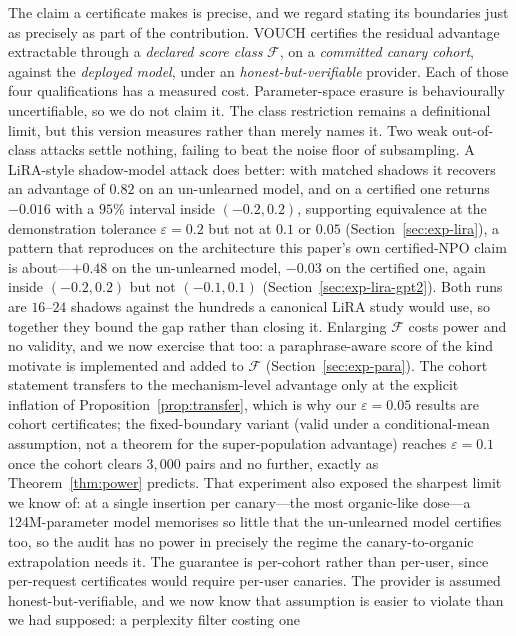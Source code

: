 \documentclass[pdflatex,sn-mathphys-num]{sn-jnl}
\theoremstyle{thmstyleone}
\theoremstyle{thmstyletwo}
\theoremstyle{thmstylethree}
\newcommand{\F}{\mathcal{F}}
\newcommand{\eps}{\varepsilon}
\begin{document}
The claim a certificate makes is precise, and we regard stating its boundaries just as
precisely as part of the contribution. VOUCH certifies the residual advantage
extractable through a \emph{declared score class} $\F$, on a \emph{committed canary
cohort}, against the \emph{deployed model}, under an \emph{honest-but-verifiable}
provider. Each of those four qualifications has a measured cost. Parameter-space
erasure is behaviourally uncertifiable, so we do not claim it. The class restriction
remains a definitional limit, but this version measures rather than merely names it.
Two weak out-of-class attacks settle nothing, failing to beat the noise floor of
subsampling. A LiRA-style shadow-model attack does better: with matched shadows it
recovers an advantage of $0.82$ on an un-unlearned model, and on a certified one
returns $-0.016$ with a $95\%$ interval inside $(-0.2, 0.2)$, supporting equivalence at
the demonstration tolerance $\eps=0.2$ but not at $0.1$ or $0.05$
(Section~\ref{sec:exp-lira}), a pattern that reproduces on the architecture this
paper's own certified-NPO claim is about---$+0.48$ on the un-unlearned model,
$-0.03$ on the certified one, again inside $(-0.2, 0.2)$ but not $(-0.1, 0.1)$
(Section~\ref{sec:exp-lira-gpt2}). Both runs are $16$--$24$ shadows against the
hundreds a canonical LiRA study would use, so together they bound the gap rather than
closing it. Enlarging $\F$ costs power and no validity, and
we now exercise that too: a paraphrase-aware score of the kind
\citet{li2026beliefs} motivate is implemented and added to $\F$
(Section~\ref{sec:exp-para}). The cohort statement transfers to
the mechanism-level advantage only at the explicit inflation of
Proposition~\ref{prop:transfer}, which is why our $\eps = 0.05$ results are cohort
certificates; the fixed-boundary variant (valid under a conditional-mean assumption, not a theorem for the super-population advantage) reaches $\eps = 0.1$ once the cohort clears
$3{,}000$ pairs and no further, exactly as Theorem~\ref{thm:power} predicts. That
experiment also exposed the sharpest limit we know of: at a single insertion per
canary---the most organic-like dose---a 124M-parameter model memorises so little that
the un-unlearned model certifies too, so the audit has no power in precisely the
regime the canary-to-organic extrapolation needs it. The guarantee is
per-cohort rather than per-user, since per-request certificates would require per-user
canaries. The provider is assumed honest-but-verifiable, and we now know that
assumption is easier to violate than we had supposed: a perplexity filter costing one
\end{document}
